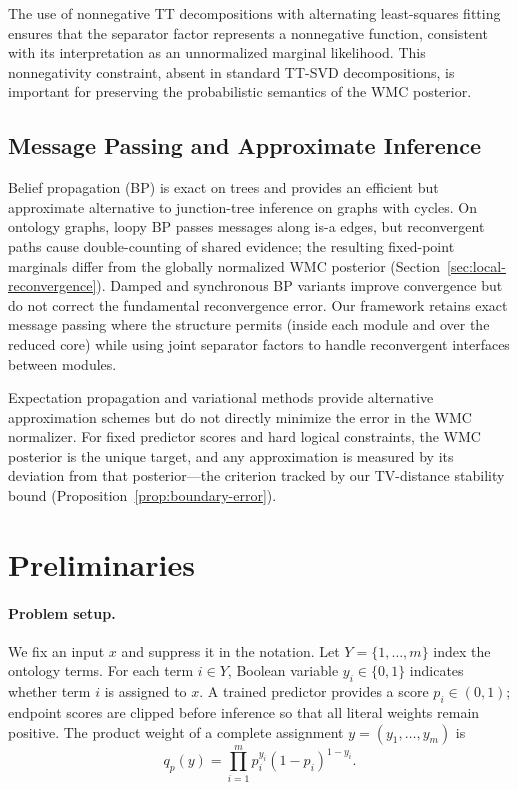 \documentclass[12pt]{article}
\begin{document}
The use of nonnegative TT decompositions with alternating least-squares
fitting \citep{lee2001nmf} ensures that the separator factor represents
a nonnegative function, consistent with its interpretation as an
unnormalized marginal likelihood. This nonnegativity constraint, absent
in standard TT-SVD decompositions, is important for preserving the
probabilistic semantics of the WMC posterior.

\subsection{Message Passing and Approximate Inference}

Belief propagation (BP) \citep{pearl1988probabilistic} is exact on trees
and provides an efficient but approximate alternative to junction-tree
inference on graphs with cycles. On ontology graphs, loopy BP passes
messages along is-a edges, but reconvergent paths cause double-counting
of shared evidence; the resulting fixed-point marginals differ from the
globally normalized WMC posterior (Section~\ref{sec:local-reconvergence}).
Damped and synchronous BP variants \citep{murphy1999loopy} improve
convergence but do not correct the fundamental reconvergence error.
Our framework retains exact message passing where the structure permits
(inside each module and over the reduced core) while using joint
separator factors to handle reconvergent interfaces between modules.

Expectation propagation \citep{minka2001ep} and variational methods
\citep{wainwright2008graphical} provide alternative approximation schemes
but do not directly minimize the error in the WMC normalizer. For fixed
predictor scores and hard logical constraints, the WMC posterior is the
unique target, and any approximation is measured by its deviation from
that posterior---the criterion tracked by our TV-distance stability
bound (Proposition~\ref{prop:boundary-error}).

\section{Preliminaries}
\label{sec:preliminaries}

\paragraph{Problem setup.}
We fix an input $x$ and suppress it in the notation. Let $Y=\{1,\ldots,m\}$
index the ontology terms. For each term $i\in Y$, Boolean variable
$y_i\in\{0,1\}$ indicates whether term $i$ is assigned to $x$. A
trained predictor provides a score $p_i\in(0,1)$; endpoint scores are
clipped before inference so that all literal weights remain positive.
The product weight of a complete assignment $y=(y_1,\ldots,y_m)$ is
\[
  q_p(y) = \prod_{i=1}^m p_i^{y_i}(1-p_i)^{1-y_i}.
\]
\end{document}
